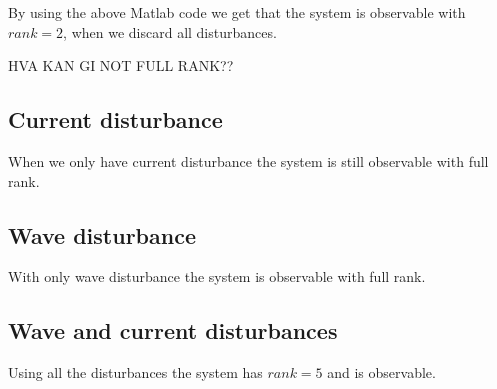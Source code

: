 By using the above Matlab code we get that the system is observable with $rank = 2$, when we discard all disturbances.

HVA KAN GI NOT FULL RANK??
\subsection{Current disturbance}
When we only have current disturbance the system is still observable with full rank.  

\subsection{Wave disturbance}
With only wave disturbance the system is observable with full rank.

\subsection{Wave and current disturbances}
Using all the disturbances the system has $rank = 5$ and is observable.

